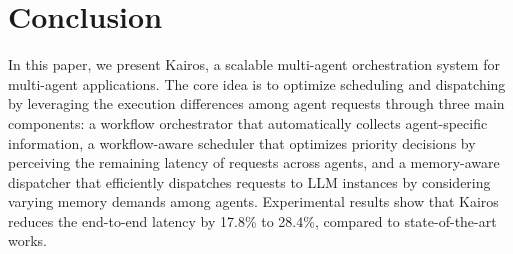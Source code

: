 \documentclass[sigplan,nonacm]{acmart}
\newcommand{\system}{Kairos}
\begin{document}
\section{Conclusion}
In this paper, we present \system{}, a scalable multi-agent orchestration system for multi-agent applications. 
The core idea is to optimize scheduling and dispatching by leveraging the execution differences among agent requests through three main components: a workflow orchestrator that automatically collects agent-specific information, a workflow-aware scheduler that optimizes priority decisions by perceiving the remaining latency of requests across agents, and a memory-aware dispatcher that efficiently dispatches requests to LLM instances by considering varying memory demands among agents.
Experimental results show that \system{} reduces the end-to-end latency by 17.8\% to 28.4\%, compared to state-of-the-art works.



\end{document}
